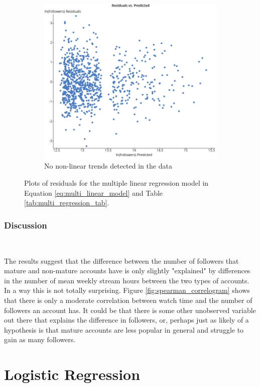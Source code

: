 \documentclass[12pt]{article}
\begin{document}
\begin{figure}
\begin{subfigure}{0.45\textwidth}
        \includegraphics[width=\textwidth]{../StatCrunch_Results/followers_mature_watch_hrs/residual_plot}
        \caption{No non-linear trends detected in the data}
        \label{fig:plot2}
    \end{subfigure}
    \caption{Plots of residuals for the multiple linear regression model in Equation \ref{eq:multi_linear_model} and Table \ref{tab:multi_regression_tab}.}
    \label{fig:both_plots}
\end{figure}

\subsubsection{Discussion}\

The results suggest that the difference between the number of followers that mature and non-mature accounts have is only slightly "explained" by differences in the number of mean weekly stream hours between the two types of accounts. In a way this is not totally surprising. Figure \ref{fig:spearman_correlogram} shows that there is only a moderate correlation between watch time and the number of followers an account has. It could be that there is some other unobserved variable out there that explains the difference in followers, or, perhaps just as likely of a hypothesis is that mature accounts are less popular in general and struggle to gain as many followers.

\section{Logistic Regression}
\end{document}
